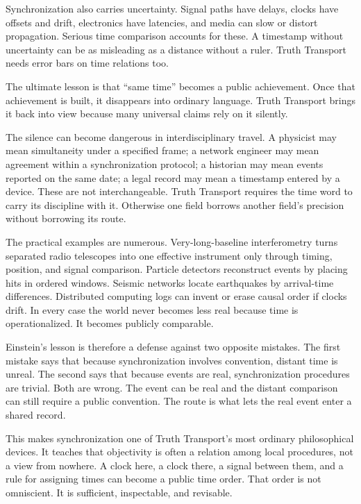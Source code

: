 Synchronization also carries uncertainty. Signal paths have delays, clocks
have offsets and drift, electronics have latencies, and media can slow or
distort propagation. Serious time comparison accounts for these. A
timestamp without uncertainty can be as misleading as a distance without a
ruler. Truth Transport needs error bars on time relations too.

The ultimate lesson is that ``same time'' becomes a public achievement.
Once that achievement is built, it disappears into ordinary language.
Truth Transport brings it back into view because many universal claims
rely on it silently.

The silence can become dangerous in interdisciplinary travel. A physicist
may mean simultaneity under a specified frame; a network engineer may
mean agreement within a synchronization protocol; a historian may mean
events reported on the same date; a legal record may mean a timestamp
entered by a device. These are not interchangeable. Truth Transport
requires the time word to carry its discipline with it. Otherwise one
field borrows another field's precision without borrowing its route.

The practical examples are numerous. Very-long-baseline interferometry
turns separated radio telescopes into one effective instrument only
through timing, position, and signal comparison. Particle detectors
reconstruct events by placing hits in ordered windows. Seismic networks
locate earthquakes by arrival-time differences. Distributed computing
logs can invent or erase causal order if clocks drift. In every case the
world never becomes less real because time is operationalized. It becomes
publicly comparable.

Einstein's lesson is therefore a defense against two opposite mistakes.
The first mistake says that because synchronization involves convention,
distant time is unreal. The second says that because events are real,
synchronization procedures are trivial. Both are wrong. The event can be
real and the distant comparison can still require a public convention.
The route is what lets the real event enter a shared record.

This makes synchronization one of Truth Transport's most ordinary
philosophical devices. It teaches that objectivity is often a relation
among local procedures, not a view from nowhere. A clock here, a clock
there, a signal between them, and a rule for assigning times can become a
public time order. That order is not omniscient. It is sufficient,
inspectable, and revisable.

